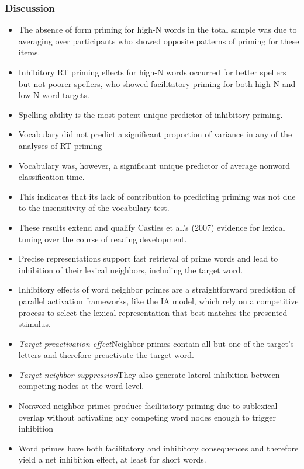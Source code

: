\documentclass[]{article}
\begin{document}
{			\subsubsection{Discussion}
			\begin{itemize}
				\item The absence of form priming for high-N words in the total sample was due to averaging over participants who showed opposite patterns of priming for these items. 
				\item Inhibitory RT priming effects for high-N words occurred for better spellers but not poorer spellers, who showed facilitatory priming for both high-N and low-N word targets.
				\item Spelling ability is the most potent unique predictor of inhibitory priming.
				\item Vocabulary did not predict a significant proportion of variance in any of the analyses of RT priming
				\item Vocabulary was, however, a significant unique predictor of average nonword classification time.
				\item This indicates that its lack of contribution to predicting priming was not due to the insensitivity of the vocabulary test.
				\item These results extend and qualify Castles et al.’s (2007) evidence for lexical tuning over the course of reading development.
				\item Precise representations support fast retrieval of prime words and lead to inhibition of their lexical neighbors, including the target word.
				\item Inhibitory effects of word neighbor primes are a straightforward prediction of parallel activation frameworks, like the IA model, which rely on a competitive process to select the lexical representation that best matches the presented stimulus.
				\item \textit{Target preactivation effect}\textendash 	Neighbor primes contain all but one of the target’s letters and therefore preactivate the target word.
				\item \textit{Target neighbor suppression}\textendash They also generate lateral inhibition between competing nodes at the word level.
				\item Nonword neighbor primes produce facilitatory priming due to sublexical overlap without activating any competing word nodes enough to trigger inhibition
				\item Word primes have both facilitatory and inhibitory consequences and therefore yield a net inhibition effect, at least for short words.

\end{itemize}}
\end{document}
